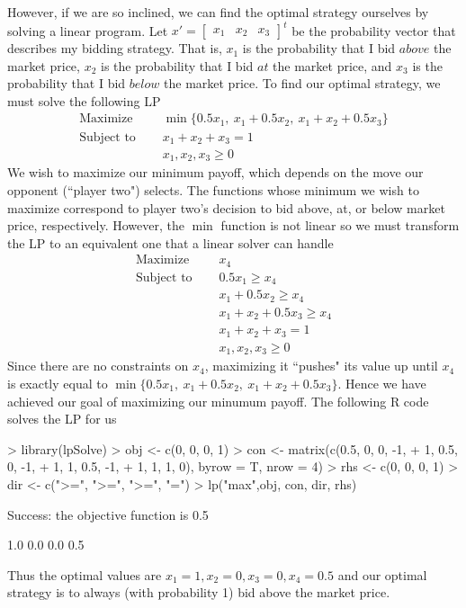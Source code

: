 \documentclass[11pt, oneside]{article}     %
\begin{document}
However, if we are so inclined, we can find the optimal strategy ourselves
by solving a linear program. Let $x' = \begin{bmatrix}x_1 & x_2 & x_3\end{bmatrix}^t$ 
be the probability vector that describes my bidding strategy. 
That is, $x_1$ is  the probability that I bid $above$ the market price, $x_2$ 
is the probability that I bid $at$ the market price, and $x_3$ is the 
probability that I bid $below$ the market price. To find our optimal 
strategy, we must solve the following LP
\begin{align*}
\text{Maximize~~~~}&\min\{0.5x_1,~x_1 +0.5x_2,~x_1 + x_2+0.5x_3\}\\
\text{Subject to~~~~}&x_1 + x_2 + x_3 = 1\\
&x_1, x_2, x_3 \ge 0
\end{align*}
We wish to maximize our minimum payoff, which depends on the move
our opponent (``player two") selects. The functions whose minimum we wish
to maximize correspond to 
player two's decision to bid above, at, or below market price, respectively.
However, the $\min$ function is not linear so we must transform the LP 
to an equivalent one that a linear solver can handle
\begin{align*}
\text{Maximize~~~~}&x_4\\
\text{Subject to~~~~}&0.5x_1 \ge x_4 \\
&x_1 +0.5x_2 \ge x_4\\
&x_1 + x_2+0.5x_3 \ge x_4\\
&x_1 + x_2 + x_3 = 1\\
&x_1, x_2, x_3 \ge 0
\end{align*}
Since there are no constraints on $x_4$, maximizing it ``pushes" its value
up until $x_4$ is exactly equal to 
$\min\{0.5x_1,~x_1 +0.5x_2,~x_1 + x_2+0.5x_3\}$. Hence we have achieved our goal
of maximizing our minumum payoff.
The following R code solves the LP for us
\begin{Schunk}
\begin{Sinput}
> library(lpSolve)
> obj <- c(0, 0, 0, 1)
> con <- matrix(c(0.5, 0, 0, -1,
+                 1, 0.5, 0, -1,
+                 1, 1, 0.5, -1,
+                 1, 1, 1, 0), byrow = T, nrow = 4)
> rhs <- c(0, 0, 0, 1)
> dir <- c(">=", ">=", ">=", "=")
> lp("max",obj, con, dir, rhs)
\end{Sinput}
\begin{Soutput}
Success: the objective function is 0.5 
\end{Soutput}
\begin{Soutput}
[1] 1.0 0.0 0.0 0.5
\end{Soutput}
\end{Schunk}
Thus the optimal values are $x_1 = 1, x_2 = 0, x_3 = 0, 
x_4 = 0.5$ and our optimal strategy is to always (with probability 1) bid 
above the market price.
\end{document}
